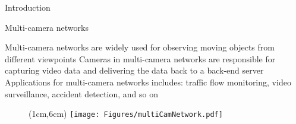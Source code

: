 \begin{frame}{Introduction}
\begin{itemize}
	\myItem Multi-camera networks
	\begin{itemize}
		\mySubItem Multi-camera networks are widely used for observing moving objects from different viewpoints
		\mySubItem Cameras in multi-camera networks are responsible for capturing video data and delivering the data back to a back-end server
		\mySubItem Applications for multi-camera networks includes: traffic flow monitoring, video surveillance, accident detection, and so on
	\end{itemize}
\end{itemize}
%
\begin{figure}
\centering
\begin{textblock*}{1cm}(1cm,6cm) %
\texttt{[image: Figures/multiCamNetwork.pdf]}
\end{textblock*}
\end{figure}
%
\end{frame}
